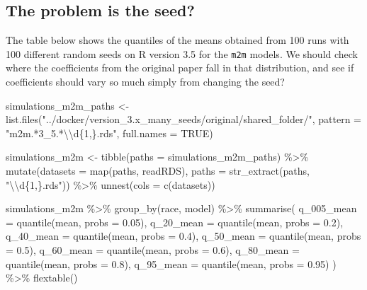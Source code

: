 \documentclass[
  letterpaper,
  DIV=11,
  numbers=noendperiod]{scrartcl}
\newenvironment{Shaded}{\begin{snugshade}}{\end{snugshade}}
\newcommand{\AttributeTok}[1]{\textcolor[rgb]{0.40,0.45,0.13}{#1}}
\newcommand{\ConstantTok}[1]{\textcolor[rgb]{0.56,0.35,0.01}{#1}}
\newcommand{\FloatTok}[1]{\textcolor[rgb]{0.68,0.00,0.00}{#1}}
\newcommand{\FunctionTok}[1]{\textcolor[rgb]{0.28,0.35,0.67}{#1}}
\newcommand{\NormalTok}[1]{\textcolor[rgb]{0.00,0.23,0.31}{#1}}
\newcommand{\OtherTok}[1]{\textcolor[rgb]{0.00,0.23,0.31}{#1}}
\newcommand{\SpecialCharTok}[1]{\textcolor[rgb]{0.37,0.37,0.37}{#1}}
\newcommand{\StringTok}[1]{\textcolor[rgb]{0.13,0.47,0.30}{#1}}
\begin{document}
\hypertarget{the-problem-is-the-seed}{%
\subsection{The problem is the seed?}\label{the-problem-is-the-seed}}

The table below shows the quantiles of the means obtained from 100 runs
with 100 different random seeds on R version 3.5 for the \texttt{m2m}
models. We should check where the coefficients from the original paper
fall in that distribution, and see if coefficients should vary so much
simply from changing the seed?

\begin{Shaded}
\begin{Highlighting}[]
\NormalTok{simulations\_m2m\_paths }\OtherTok{\textless{}{-}} \FunctionTok{list.files}\NormalTok{(}\StringTok{"../docker/version\_3.x\_many\_seeds/original/shared\_folder/"}\NormalTok{, }\AttributeTok{pattern =} \StringTok{"m2m.*3\_5.*}\SpecialCharTok{\textbackslash{}\textbackslash{}}\StringTok{d\{1,\}.rds"}\NormalTok{, }\AttributeTok{full.names =} \ConstantTok{TRUE}\NormalTok{)}

\NormalTok{simulations\_m2m }\OtherTok{\textless{}{-}} \FunctionTok{tibble}\NormalTok{(}\AttributeTok{paths =}\NormalTok{ simulations\_m2m\_paths) }\SpecialCharTok{\%\textgreater{}\%}
  \FunctionTok{mutate}\NormalTok{(}\AttributeTok{datasets =} \FunctionTok{map}\NormalTok{(paths, readRDS),}
         \AttributeTok{paths =} \FunctionTok{str\_extract}\NormalTok{(paths, }\StringTok{"}\SpecialCharTok{\textbackslash{}\textbackslash{}}\StringTok{d\{1,\}.rds"}\NormalTok{)) }\SpecialCharTok{\%\textgreater{}\%}
  \FunctionTok{unnest}\NormalTok{(}\AttributeTok{cols =} \FunctionTok{c}\NormalTok{(datasets))}

\NormalTok{simulations\_m2m }\SpecialCharTok{\%\textgreater{}\%}
  \FunctionTok{group\_by}\NormalTok{(race, model) }\SpecialCharTok{\%\textgreater{}\%}
  \FunctionTok{summarise}\NormalTok{(}
    \AttributeTok{q\_005\_mean =} \FunctionTok{quantile}\NormalTok{(mean, }\AttributeTok{probs =} \FloatTok{0.05}\NormalTok{),}
    \AttributeTok{q\_20\_mean =} \FunctionTok{quantile}\NormalTok{(mean, }\AttributeTok{probs =} \FloatTok{0.2}\NormalTok{),}
    \AttributeTok{q\_40\_mean =} \FunctionTok{quantile}\NormalTok{(mean, }\AttributeTok{probs =} \FloatTok{0.4}\NormalTok{),}
    \AttributeTok{q\_50\_mean =} \FunctionTok{quantile}\NormalTok{(mean, }\AttributeTok{probs =} \FloatTok{0.5}\NormalTok{),}
    \AttributeTok{q\_60\_mean =} \FunctionTok{quantile}\NormalTok{(mean, }\AttributeTok{probs =} \FloatTok{0.6}\NormalTok{),}
    \AttributeTok{q\_80\_mean =} \FunctionTok{quantile}\NormalTok{(mean, }\AttributeTok{probs =} \FloatTok{0.8}\NormalTok{),}
    \AttributeTok{q\_95\_mean =} \FunctionTok{quantile}\NormalTok{(mean, }\AttributeTok{probs =} \FloatTok{0.95}\NormalTok{)}
\NormalTok{  ) }\SpecialCharTok{\%\textgreater{}\%}
  \FunctionTok{flextable}\NormalTok{()}
\end{Highlighting}
\end{Shaded}
\end{document}
